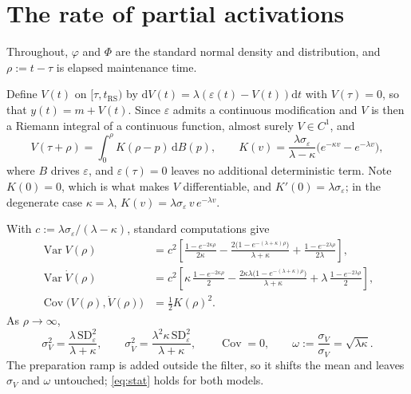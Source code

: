 \documentclass[a4paper,11pt]{article}
\newcommand{\Var}{\operatorname{Var}}
\newcommand{\Cov}{\operatorname{Cov}}
\newcommand{\dd}{\mathrm d}
\newcommand{\1}{\mathbbm{1}}
\newcommand{\trs}{t_{\mathrm{RS}}}
\begin{document}
\appendix




\section{The rate of partial activations}
\label{app:nu}

Throughout, $\varphi$ and $\Phi$ are the standard normal density and distribution, and
$\rho:=t-\tau$ is elapsed maintenance time.

Define $V(t)$ on $[\tau,\trs)$ by $\dd V(t)=\lambda(\varepsilon(t)-V(t))\dd t$ with
$V(\tau)=0$, so that $y(t)=m+V(t)$. Since $\varepsilon$ admits a continuous modification
and $V$ is then a Riemann integral of a continuous function, almost surely $V\in C^{1}$,
and
\begin{equation}
V(\tau+\rho)=\int_0^\rho K(\rho-p)\,\dd B(p),
\qquad
K(v)=\frac{\lambda\sigma_\varepsilon}{\lambda-\kappa}
\bigl(e^{-\kappa v}-e^{-\lambda v}\bigr),
\label{eq:kernel}
\end{equation}
where $B$ drives $\varepsilon$, and $\varepsilon(\tau)=0$ leaves no additional
deterministic term. Note $K(0)=0$, which is what makes $V$ differentiable, and
$K'(0)=\lambda\sigma_\varepsilon$; in the degenerate case $\kappa=\lambda$,
$K(v)=\lambda\sigma_\varepsilon\,v\,e^{-\lambda v}$.

With $c:=\lambda\sigma_\varepsilon/(\lambda-\kappa)$, standard computations give
\begin{align}
\Var V(\rho)&=c^{2}\left[\frac{1-e^{-2\kappa\rho}}{2\kappa}
-\frac{2\bigl(1-e^{-(\lambda+\kappa)\rho}\bigr)}{\lambda+\kappa}
+\frac{1-e^{-2\lambda\rho}}{2\lambda}\right],\\
\Var\dot V(\rho)&=c^{2}\left[\kappa\,\frac{1-e^{-2\kappa\rho}}{2}
-\frac{2\kappa\lambda\bigl(1-e^{-(\lambda+\kappa)\rho}\bigr)}{\lambda+\kappa}
+\lambda\,\frac{1-e^{-2\lambda\rho}}{2}\right],\\
\Cov\bigl(V(\rho),\dot V(\rho)\bigr)&=\tfrac12 K(\rho)^{2}.
\end{align}
As $\rho\to\infty$,
\begin{equation}
\sigma_V^{2}=\frac{\lambda\,\mathrm{SD}_\varepsilon^{2}}{\lambda+\kappa},
\qquad
\sigma_{\dot V}^{2}=\frac{\lambda^{2}\kappa\,\mathrm{SD}_\varepsilon^{2}}{\lambda+\kappa},
\qquad
\Cov=0,
\qquad
\omega:=\frac{\sigma_{\dot V}}{\sigma_V}=\sqrt{\lambda\kappa}.
\label{eq:stat}
\end{equation}
The preparation ramp is added outside the filter, so it shifts the mean and leaves
$\sigma_V$ and $\omega$ untouched; \eqref{eq:stat} holds for both models.
\end{document}
